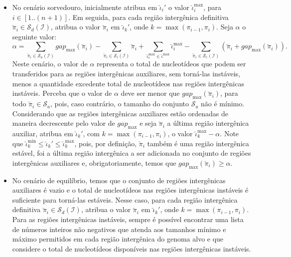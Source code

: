 \begin{itemize}
\begin{itemize}
    \item No cenário sorvedouro, inicialmente atribua em $\breve\iota_{i}'$ o valor $\breve\iota^{\max}_i$, para $i \in [1..({n+1})]$. Em seguida, para cada região intergênica definitiva $\breve\pi_i \in \mathcal{S}_{d}(\mathcal{I})$, atribua o valor $\breve\pi_i$ em $\breve\iota_{k}'$, onde $k = \max(\pi_{i-1},\pi_i)$. Seja $\alpha$ o seguinte valor:
  $$\alpha = \sum_{\breve\pi_i \in \mathcal{S}_{a}(\mathcal{I})} gap_{\max}(\breve\pi_i) - \sum_{\breve\pi_i \in \mathcal{S}_{i}(\mathcal{I})} \breve\pi_i + \sum_{\breve\iota_{i}^{\max}  \in \breve\iota^{\max}} \breve\iota_{i}^{\max} - \sum_{\breve\pi_i \in \mathcal{S}_{e}(\mathcal{I})} (\breve\pi_i + gap_{\max}(\breve\pi_i)).$$
    Neste cenário, o valor de $\alpha$ representa o total de nucleotídeos que podem ser transferidos para as regiões intergênicas auxiliares, sem torná-las instáveis, menos a quantidade excedente total de nucleotídeos nas regiões intergênicas instáveis. Perceba que o valor de $\alpha$ deve ser menor que $gap_{\max}(\breve\pi_i)$, para todo $\breve\pi_i \in \mathcal{S}_{a}$, pois, caso contrário, o tamanho do conjunto $\mathcal{S}_{a}$ não é mínimo. Considerando que as regiões intergênicas auxiliares estão ordenadas de maneira decrescente pelo valor de $gap_{\max}$ e seja $\breve\pi_i$ a última região intergênica auxiliar, atribua em $\breve\iota_{k}'$, com $k = \max(\pi_{i-1},\pi_i)$, o valor $\breve\iota^{\max}_k - \alpha$. Note que $\breve\iota^{\min}_k \le \breve\iota_{k}' \le \breve\iota^{\max}_k$, pois, por definição, $\breve\pi_i$ também é uma região intergênica estável, foi a última região intergênica a ser adicionada no conjunto de regiões intergênicas auxiliares e, obrigatoriamente, temos que $gap_{\max}(\breve\pi_i) \ge \alpha$.

    \item No cenário de equilíbrio, temos que o conjunto de regiões intergênicas auxiliares é vazio e o total de nucleotídeos nas regiões intergênicas instáveis é suficiente para torná-las estáveis. Nesse caso, para cada região intergênica definitiva $\breve\pi_i \in \mathcal{S}_{d}(\mathcal{I})$, atribua o valor $\breve\pi_i$ em $\breve\iota_{k}'$, onde $k = \max(\pi_{i-1},\pi_i)$. Para as regiões intergênicas instáveis, sempre é possível encontrar uma lista de números inteiros não negativos que atenda aos tamanhos mínimo e máximo permitidos em cada região intergênica do genoma alvo e que considere o total de nucleotídeos disponíveis nas regiões intergênicas instáveis.
  \end{itemize}
\end{itemize}

